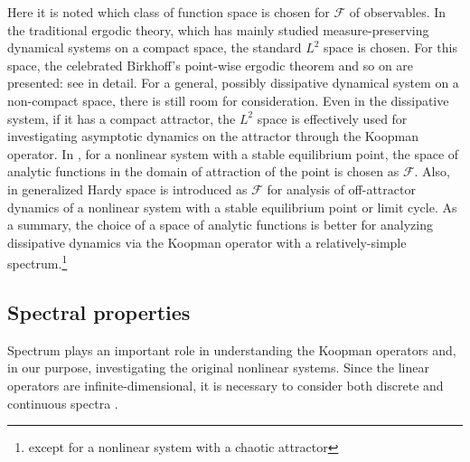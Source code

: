 \documentclass[a4paper,10pt]{article}
\def\cF{{\mathcal{F}}}
\begin{document}
%
Here it is noted which class of function space is chosen for $\cF$ of observables.  
In the traditional ergodic theory, which has mainly studied measure-preserving dynamical systems on a compact space, the standard $L^2$ space is chosen.  
For this space, the celebrated Birkhoff's point-wise ergodic theorem and so on are presented: see \cite{Arnold:1968} in detail.     
For a general, possibly dissipative dynamical system on a non-compact space, there is still room for consideration.  
Even in the dissipative system, if it has a compact attractor, the $L^2$ space is effectively used for investigating asymptotic dynamics on the attractor through the Koopman operator.  
In \cite{Mauroy_PD261}, for a nonlinear system with a stable equilibrium point, the space of analytic functions in the domain of attraction of the point is chosen as $\cF$.  
Also, in \cite{Ryan_Preprint} generalized Hardy space is introduced as $\cF$ for analysis of off-attractor dynamics of a nonlinear system with a stable equilibrium point or limit cycle.  
As a summary, the choice of a space of analytic functions is better for analyzing dissipative dynamics via the Koopman operator with a relatively-simple spectrum.\footnote{except for a nonlinear system with a chaotic attractor}  


\subsection{Spectral properties}
\label{subsec:spectral}

Spectrum plays an important role in understanding the Koopman operators and, in our purpose, investigating the original nonlinear systems.  
Since the linear operators are infinite-dimensional, it is necessary to consider both discrete and continuous spectra \cite{Kato,Yoshida}.  
\end{document}
